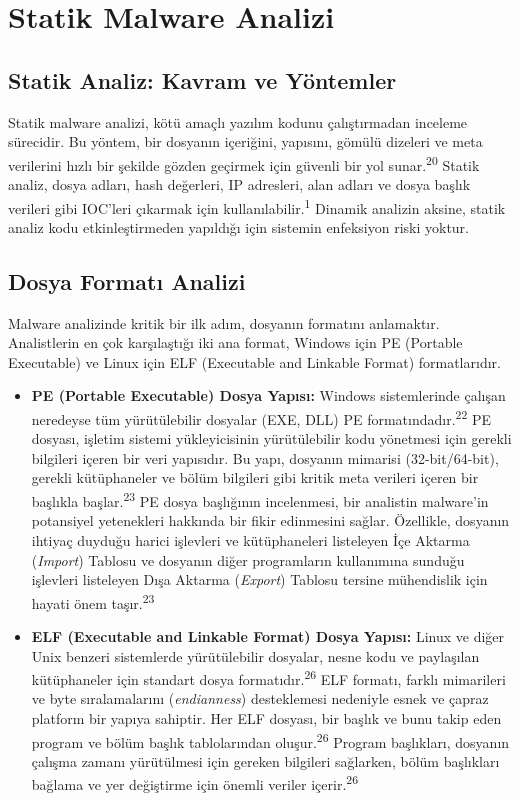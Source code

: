 \section{Statik Malware Analizi}

\subsection{Statik Analiz: Kavram ve Yöntemler}

Statik malware analizi, kötü amaçlı yazılım kodunu çalıştırmadan inceleme sürecidir. Bu yöntem, bir dosyanın içeriğini, yapısını, gömülü dizeleri ve meta verilerini hızlı bir şekilde gözden geçirmek için güvenli bir yol sunar.\textsuperscript{20} Statik analiz, dosya adları, hash değerleri, IP adresleri, alan adları ve dosya başlık verileri gibi IOC'leri çıkarmak için kullanılabilir.\textsuperscript{1} Dinamik analizin aksine, statik analiz kodu etkinleştirmeden yapıldığı için sistemin enfeksiyon riski yoktur.

\subsection{Dosya Formatı Analizi}

Malware analizinde kritik bir ilk adım, dosyanın formatını anlamaktır. Analistlerin en çok karşılaştığı iki ana format, Windows için PE (Portable Executable) ve Linux için ELF (Executable and Linkable Format) formatlarıdır.

\begin{itemize}
    \item \textbf{PE (Portable Executable) Dosya Yapısı:} Windows sistemlerinde çalışan neredeyse tüm yürütülebilir dosyalar (EXE, DLL) PE formatındadır.\textsuperscript{22} PE dosyası, işletim sistemi yükleyicisinin yürütülebilir kodu yönetmesi için gerekli bilgileri içeren bir veri yapısıdır. Bu yapı, dosyanın mimarisi (32-bit/64-bit), gerekli kütüphaneler ve bölüm bilgileri gibi kritik meta verileri içeren bir başlıkla başlar.\textsuperscript{23} PE dosya başlığının incelenmesi, bir analistin malware'in potansiyel yetenekleri hakkında bir fikir edinmesini sağlar. Özellikle, dosyanın ihtiyaç duyduğu harici işlevleri ve kütüphaneleri listeleyen İçe Aktarma (\textit{Import}) Tablosu ve dosyanın diğer programların kullanımına sunduğu işlevleri listeleyen Dışa Aktarma (\textit{Export}) Tablosu tersine mühendislik için hayati önem taşır.\textsuperscript{23}
    \item \textbf{ELF (Executable and Linkable Format) Dosya Yapısı:} Linux ve diğer Unix benzeri sistemlerde yürütülebilir dosyalar, nesne kodu ve paylaşılan kütüphaneler için standart dosya formatıdır.\textsuperscript{26} ELF formatı, farklı mimarileri ve byte sıralamalarını (\textit{endianness}) desteklemesi nedeniyle esnek ve çapraz platform bir yapıya sahiptir. Her ELF dosyası, bir başlık ve bunu takip eden program ve bölüm başlık tablolarından oluşur.\textsuperscript{26} Program başlıkları, dosyanın çalışma zamanı yürütülmesi için gereken bilgileri sağlarken, bölüm başlıkları bağlama ve yer değiştirme için önemli veriler içerir.\textsuperscript{26}
\end{itemize}

